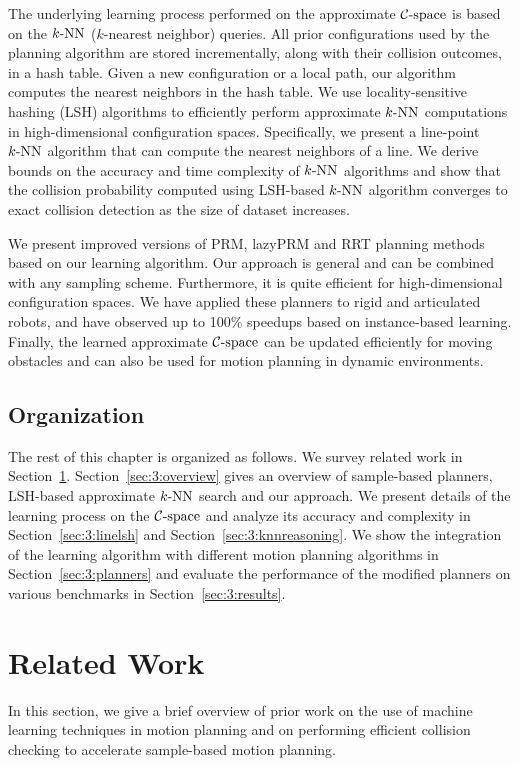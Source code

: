The underlying learning process performed on the approximate $\mathcal C\text{-space}$ is based on the $k\text{-NN}$ ($k$-nearest neighbor) queries. All prior configurations used
by the planning algorithm are stored incrementally, along with their collision outcomes, in a hash table. Given a new configuration or a local path, our algorithm computes the nearest neighbors in the hash table. We use locality-sensitive hashing (LSH) algorithms to efficiently perform approximate $k\text{-NN}$ computations in high-dimensional configuration spaces. Specifically, we present a line-point $k\text{-NN}$ algorithm that can compute the nearest neighbors of a line.
We derive bounds on the accuracy and time complexity of $k\text{-NN}$ algorithms and show that the collision probability computed using LSH-based $k\text{-NN}$ algorithm converges to exact collision detection as the size of dataset increases.

We present improved versions of PRM, lazyPRM and RRT planning methods based on our learning algorithm. Our approach is general and can be combined with any sampling scheme. Furthermore, it is quite efficient for high-dimensional configuration spaces. We have applied these planners to rigid and articulated robots, and have observed up to 100\% speedups based on instance-based learning. Finally, the learned approximate $\mathcal C\text{-space}$ can be updated efficiently for moving obstacles and can also be used for motion planning in dynamic environments.

\subsection{Organization}
The rest of this chapter is organized as follows. We survey related work in Section~\ref{sec:3:related}. Section~\ref{sec:3:overview} gives an overview of sample-based planners, LSH-based approximate $k\text{-NN}$ search and our approach. We present details of the learning process on the $\mathcal C\text{-space}$ and analyze its accuracy and complexity in Section~\ref{sec:3:linelsh} and Section~\ref{sec:3:knnreasoning}. We show the integration of the learning algorithm with different motion planning algorithms in Section~\ref{sec:3:planners} and evaluate the performance of the modified planners on various benchmarks in Section~\ref{sec:3:results}.


\section{Related Work}
\label{sec:3:related}

In this section, we give a brief overview of prior work on the use of machine learning techniques in motion planning and on performing efficient collision checking to accelerate sample-based motion planning.

